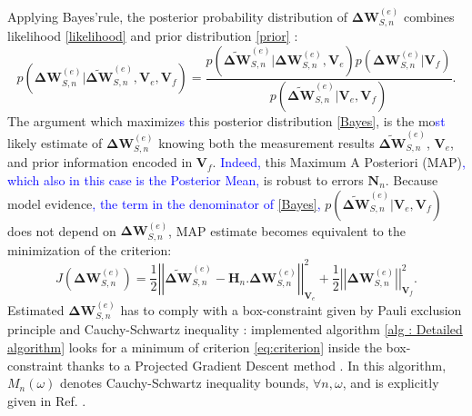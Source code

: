 \documentclass[aps,prb,superscriptaddress,preprint]{revtex4-1}
\begin{document}
	Applying Bayes'rule, the posterior probability distribution of $\mathbf{\Delta W}^{(e)}_{S,n}$ combines likelihood \eqref{likelihood} and prior distribution \eqref{prior} :
	\begin{equation}
	p\left(\mathbf{\Delta W}^{(e)}_{S,n}|\widetilde{\mathbf{\Delta W}}^{(e)}_{S,n},\mathbf{V}_{e},\mathbf{V}_{f}\right) = \frac{p\left(\widetilde{\mathbf{\Delta W}}^{(e)}_{S,n}|\mathbf{\Delta W}^{(e)}_{S,n},\mathbf{V}_{e}\right)p\left(\mathbf{\Delta W}^{(e)}_{S,n}|\mathbf{V}_{f} \right)}{p\left(\widetilde{\mathbf{\Delta W}}^{(e)}_{S,n}|\mathbf{V}_{e},\mathbf{V}_{f}\right)}.
	\label{Bayes}
	\end{equation}
	The argument which maximize\textcolor{blue}{s} this posterior distribution \eqref{Bayes}, is the mo\textcolor{blue}{st} likely estimate of $\mathbf{\Delta W}^{(e)}_{S,n}$ knowing both the measurement results $\widetilde{\mathbf{\Delta W}}^{(e)}_{S,n}$, $\mathbf{V}_{e}$, and prior information encoded in $\mathbf{V}_{f}$. \textcolor{blue}{Indeed,} this Maximum A Posteriori (MAP)\textcolor{blue}{, which also in this case is the Posterior Mean,} is robust to errors $\mathbf{N}_{n}$.
	Because model evidence\textcolor{blue}{, the term in the denominator of \eqref{Bayes},} $p\left(\widetilde{\mathbf{\Delta W}}^{(e)}_{S,n}|\mathbf{V}_{e},\mathbf{V}_{f}\right)$ does not depend on $\mathbf{\Delta W}^{(e)}_{S,n}$, MAP estimate becomes equivalent to the minimization of the criterion:
	\begin{equation}
	J(\mathbf{\Delta W}^{(e)}_{S,n}) = \frac{1}{2}\left|\left|\widetilde{\mathbf{\Delta W}}^{(e)}_{S,n}-\mathbf{H}_{n}.\mathbf{\Delta W}^{(e)}_{S,n}  \right| \right|^{2}_{\mathbf{V}_{e}}+\frac{1}{2}\left| \left| \mathbf{\Delta W}^{(e)}_{S,n}  \right| \right|^{2}_{\mathbf{V}_{f}}.
	\label{eq:criterion}
	\end{equation}
	Estimated $\mathbf{\Delta W}^{(e)}_{S,n}$ has to comply with a box-constraint given by Pauli exclusion principle and Cauchy-Schwartz inequality\cite{DegioWigner2013} : implemented algorithm \ref{alg : Detailed algorithm} looks for a minimum of  criterion \eqref{eq:criterion} inside the box-constraint thanks to a Projected Gradient Descent method \cite{Bertsekas1999}. In this algorithm, $M_{n}(\omega)$ denotes Cauchy-Schwartz inequality bounds, $\forall n,\omega$, and is explicitly given in Ref. .
	
\end{document}
